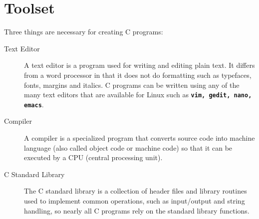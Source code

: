 \documentclass[11pt,a4paper]{article}
\begin{document}
\section*{Toolset}

Three things are necessary for creating C programs:

\begin{description} 
\item[Text Editor]  A text editor is a program used for writing and editing plain text. It differs from a word processor in that it does not do formatting such as typefaces, fonts, margins and italics.  C programs can be written using any of the many text editors that are available for Linux such as \textbf{\texttt{vim, gedit, nano, emacs}}.
\item [Compiler] A compiler is a specialized program that converts source code into machine language (also called object code or machine code) so that it can be executed by a CPU (central processing unit).
\item [C Standard Library] The C standard library is a collection of header files and library routines used to implement common operations, such as input/output and string handling, so nearly all C programs rely on the standard library functions.
\end{description} 
\end{document}
